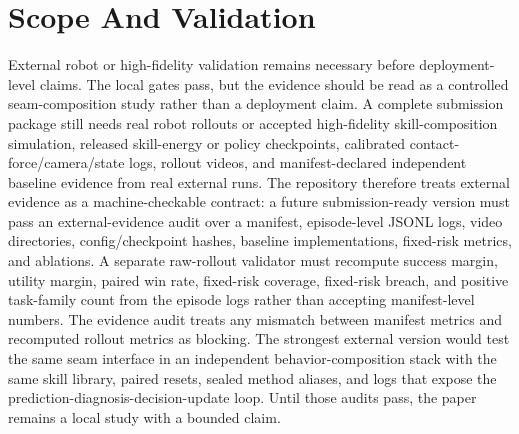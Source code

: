 \documentclass{article}
\begin{document}
\section{Scope And Validation}
External robot or high-fidelity validation remains necessary before deployment-level claims.
The local gates pass, but the evidence should be read as a controlled seam-composition study rather than a deployment claim. A complete submission package still needs real robot rollouts or accepted high-fidelity skill-composition simulation, released skill-energy or policy checkpoints, calibrated contact-force/camera/state logs, rollout videos, and manifest-declared independent baseline evidence from real external runs. The repository therefore treats external evidence as a machine-checkable contract: a future submission-ready version must pass an external-evidence audit over a manifest, episode-level JSONL logs, video directories, config/checkpoint hashes, baseline implementations, fixed-risk metrics, and ablations. A separate raw-rollout validator must recompute success margin, utility margin, paired win rate, fixed-risk coverage, fixed-risk breach, and positive task-family count from the episode logs rather than accepting manifest-level numbers. The evidence audit treats any mismatch between manifest metrics and recomputed rollout metrics as blocking. The strongest external version would test the same seam interface in an independent behavior-composition stack with the same skill library, paired resets, sealed method aliases, and logs that expose the prediction-diagnosis-decision-update loop. Until those audits pass, the paper remains a local study with a bounded claim.
\begingroup
\raggedright


\endgroup
\end{document}
